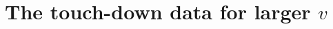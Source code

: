
\newcommand{\HTvb}{\bar v}
\newcommand{\HTmb}{\bar\mu}
\newcommand{\HTmTb}{\bar\mu_{\mathrm T}}
\newcommand{\HTeb}{\bar\varepsilon}
\newcommand{\HTxb}{\bar\xi_{\mathrm e}}
\newcommand{\HTSC}[1]{\textup{(SC#1)}}

\section{The touch-down data for larger \texorpdfstring{$v$}{v}}\label{sec:HTp}

